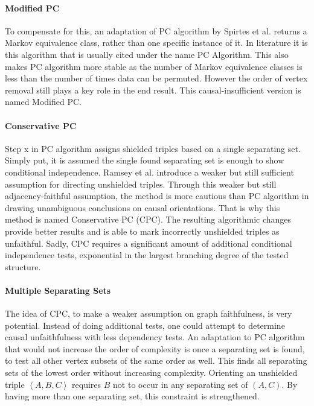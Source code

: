 \documentclass[a4paper, 10pt, english, onecolumn]{article}
\begin{document}
\paragraph{Modified PC}
To compensate for this, an adaptation of PC algorithm by Spirtes et al. returns a Markov equivalence class, rather than one specific instance of it.
In literature it is this algorithm that is usually cited under the name PC Algorithm.
This also makes PC algorithm more stable as the number of Markov equivalence classes is less than the number of times data can be permuted.
However the order of vertex removal still plays a key role in the end result.
This causal-insufficient version is named Modified PC.

\paragraph{Conservative PC}
Step x in PC algorithm assigns shielded triples based on a single separating set. %
Simply put, it is assumed the single found separating set is enough to show conditional independence. 
Ramsey et al. \cite{ramsey2012} introduce a weaker but still sufficient assumption for directing unshielded triples.
Through this weaker but still adjacency-faithful assumption, the method is more cautious than PC algorithm in drawing unambiguous conclusions on causal orientations.
That is why this method is named Conservative PC (CPC).
The resulting algorithmic changes provide better results and is able to mark incorrectly unshielded triples as unfaithful.
Sadly, CPC requires a significant amount of additional conditional independence tests, exponential in the largest branching degree of the tested structure.

\paragraph{Multiple Separating Sets}
The idea of CPC, to make a weaker assumption on graph faithfulness, is very potential.
Instead of doing additional tests, one could attempt to determine causal unfaithfulness with less dependency tests.
An adaptation to PC algorithm that would not increase the order of complexity is once a separating set is found, to test all other vertex subsets of the same order as well.
This finds all separating sets of the lowest order without increasing complexity.
Orienting an unshielded triple $\left<A,B,C\right>$ requires $B$ not to occur in any separating set of $(A,C)$.
By having more than one separating set, this constraint is strengthened.
\end{document}
